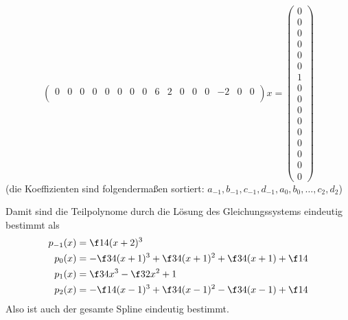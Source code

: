 \documentclass{mywork}
\begin{document}
\begin{aufgabe}
\[\begin{pmatrix}
			0 & 0 & 0 & 0 & 0 & 0 & 0 & 0 & 6 & 2 & 0 & 0 & 0 &-2 & 0 & 0 \\
		\end{pmatrix}
		x =
		\begin{pmatrix}
			0 \\ 0 \\ 0 \\ 0 \\ 0 \\ 0 \\ 1 \\ 0 \\ 0 \\ 0 \\ 0 \\ 0 \\ 0 \\ 0 \\ 0 \\ 0
		\end{pmatrix}
	\]
	(die Koeffizienten sind folgendermaßen sortiert: $a_{-1}, b_{-1}, c_{-1}, d_{-1}, a_0, b_0, \dotsc, c_2, d_2$)

	Damit sind die Teilpolynome durch die Lösung des Gleichungssystems eindeutig bestimmt als
	\begin{align*}
		p_{-1}(x) &= \f 14 (x+2)^3 \\
		p_{0}(x) &= -\f 34 (x+1)^3 + \f 34 (x+1)^2 + \f 34 (x+1) + \f 14 \\
		p_{1}(x) &= \f 34 x^3 - \f 32 x^2 + 1 \\
		p_{2}(x) &= -\f 14 (x-1)^3 + \f 34 (x-1)^2 - \f 34 (x-1) + \f 14 \\
	\end{align*}
	Also ist auch der gesamte Spline eindeutig bestimmt.
\end{aufgabe}
\end{document}
